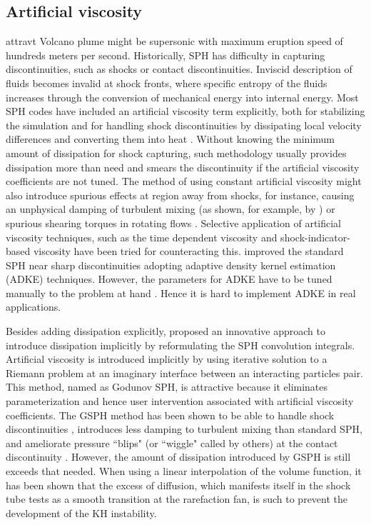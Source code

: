 \subsection{Artificial viscosity}
attravt
Volcano plume might be supersonic with maximum eruption speed of hundreds meters per second.
Historically, SPH has difficulty in capturing discontinuities, such as shocks or contact discontinuities. Inviscid description of fluids becomes invalid at shock fronts, where specific entropy of the fluids increases through the conversion of mechanical energy into internal energy. Most SPH codes have included an artificial viscosity term explicitly, both for stabilizing the simulation and for handling shock discontinuities by dissipating local velocity differences and converting them into heat \citep{monaghan1983shock, monaghan1997sph, klapp2012strong}. Without knowing the minimum amount of dissipation for shock capturing, such methodology usually provides dissipation more than need and smears the discontinuity if the artificial viscosity coefficients are not tuned. The method of using constant artificial viscosity might also introduce spurious effects at region away from shocks, for instance, causing an unphysical damping of turbulent mixing (as shown, for example, by \citet{borgani2012hydrodynamic}) or spurious
shearing torques in rotating flows \citep{flebbe1994smoothed}. Selective application of artificial viscosity techniques, such as the time dependent viscosity \citep{morris1997switch, dolag2005turbulent} and shock-indicator-based viscosity \citep{cullen2010inviscid} have been tried for counteracting this. 
\citet{sigalotti2008adaptive} improved the standard SPH near sharp discontinuities adopting adaptive density kernel estimation (ADKE) techniques. However, the parameters for ADKE have to be tuned manually to the problem at hand \citep{puri2014comparison}. Hence it is hard to implement ADKE in real applications.

Besides adding dissipation explicitly, \citet{inutsuka2002reformulation} proposed an innovative approach to introduce dissipation implicitly by reformulating the SPH convolution integrals. Artificial viscosity is introduced implicitly by using iterative solution to a Riemann problem at an imaginary interface between an interacting particles pair. This method, named as Godunov SPH, is attractive because it eliminates parameterization and hence user intervention associated with artificial viscosity coefficients. The GSPH method has been shown to be able to handle shock discontinuities \citep{inutsuka2002reformulation, cha2003implementations,iwasaki2011smoothed, puri2014approximate}, introduces less damping to turbulent mixing \citep{cha2010kelvin, borgani2012hydrodynamic} than standard SPH, and ameliorate pressure ``blips" (or ``wiggle" called by others) at the contact discontinuity \citep{borgani2012hydrodynamic}. However, the amount of dissipation introduced by GSPH is still exceeds that needed. When using a linear interpolation of the volume function, it has been shown \citep{borgani2012hydrodynamic} that the excess of diffusion, which manifests itself in the shock tube tests as a smooth transition at the rarefaction fan, is such to prevent the development of the KH instability.

